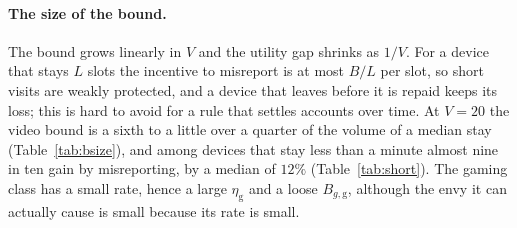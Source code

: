 \documentclass[preprint,11pt]{elsarticle}
\theoremstyle{definition}
\theoremstyle{remark}
\begin{document}
\paragraph{The size of the bound.}
The bound grows linearly in $V$ and the utility gap shrinks as $1/V$.
For a device that stays $L$ slots the incentive to misreport is at most $B/L$ per slot, so short visits are weakly protected, and a device that leaves before it is repaid keeps its loss; this is hard to avoid for a rule that settles accounts over time. At $V=20$ the video bound is a sixth to a little over a quarter of the volume of a median stay (Table~\ref{tab:bsize}), and among devices that stay less than a minute almost nine in ten gain by misreporting, by a median of $12\%$ (Table~\ref{tab:short}).
The gaming class has a small rate, hence a large $\eta_{\mathrm{g}}$ and a loose $B_{g,\mathrm{g}}$, although the envy it can actually cause is small because its rate is small.
\end{document}
